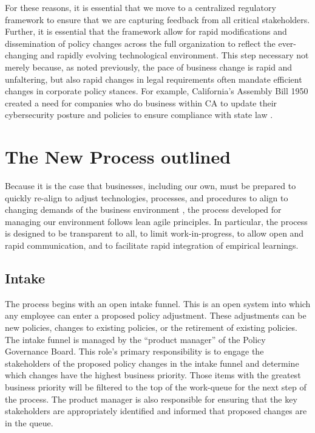 \documentclass[stu]{apa7}
\begin{document}
For these reasons, it is essential that we move to a centralized regulatory framework to ensure that we are capturing feedback from all critical stakeholders. Further, it is essential that the framework allow for rapid modifications and dissemination of policy changes across the full organization to reflect the ever-changing and rapidly evolving technological environment. This step necessary not merely because, as noted previously, the pace of business change is rapid and unfaltering, but also rapid changes in legal requirements often mandate efficient changes in corporate policy stances. For example, California's Assembly Bill 1950 created a need for companies who do business within CA to update their cybersecurity posture and policies to ensure compliance with state law \citep{srivastavaRegulationPublicPolicy2021}.


\section{The New Process outlined}
\label{sec:org6b33090}

Because it is the case that businesses, including our own, must be prepared to quickly re-align to adjust technologies, processes, and procedures to align to changing demands of the business environment \citep{ullahBusinessInformationTechnology2017a}, the process developed for managing our environment follows lean agile principles. In particular, the process is designed to be transparent to all, to limit work-in-progress, to allow open and rapid communication, and to facilitate rapid integration of empirical learnings.

\subsection{Intake}
\label{sec:orgacd2648}

The process begins with an open intake funnel. This is an open system into which any employee can enter a proposed policy adjustment. These adjustments can be new policies, changes to existing policies, or the retirement of existing policies. The intake funnel is managed by the ``product manager'' of the Policy Governance Board. This role's primary responsibility is to engage the stakeholders of the proposed policy changes in the intake funnel and determine which changes have the highest business priority. Those items with the greatest business priority will be filtered to the top of the work-queue for the next step of the process. The product manager is also responsible for ensuring that the key stakeholders are appropriately identified and informed that proposed changes are in the queue.
\end{document}
